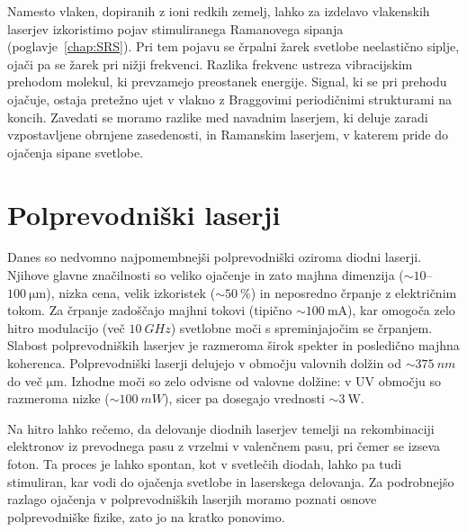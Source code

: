 \begin{remark}
 Namesto vlaken, dopiranih z ioni redkih zemelj, lahko za izdelavo vlakenskih laserjev
 izkoristimo pojav stimuliranega Ramanovega sipanja (poglavje~\ref{chap:SRS}). 
 Pri tem pojavu se črpalni žarek svetlobe neelastično siplje, ojači pa se žarek 
 pri nižji frekvenci. Razlika frekvenc ustreza vibracijskim prehodom 
 molekul, ki prevzamejo preostanek energije. Signal, ki se pri prehodu ojačuje, 
 ostaja pretežno ujet v vlakno z Braggovimi periodičnimi strukturami na koncih.
 Zavedati se moramo razlike med navadnim laserjem, ki deluje zaradi vzpostavljene
 obrnjene zasedenosti, in Ramanskim laserjem, v katerem pride do ojačenja sipane
 svetlobe.
\end{remark}

\section{Polprevodniški laserji}
Danes so nedvomno najpomembnejši polprevodniški oziroma diodni 
laserji. Njihove glavne značilnosti so veliko ojačenje in zato majhna 
dimenzija ($\sim 10$--$100~\si{\micro\metre}$), nizka cena, 
velik izkoristek ($\sim 50~\%$) in neposredno črpanje z električnim tokom. 
Za črpanje zadoščajo majhni tokovi 
(tipično $\sim 100~\si{\milli\ampere}$), kar omogoča zelo hitro modulacijo (več $10~\si{GHz}$)
svetlobne moči s spreminjajočim se črpanjem. Slabost polprevodniških laserjev je razmeroma širok 
spekter in posledično majhna koherenca. Polprevodniški laserji delujejo v območju 
valovnih dolžin od $\sim 375~\si{nm}$ do več $\si{\micro\meter}$. Izhodne moči
so zelo odvisne od valovne dolžine: v UV območju so razmeroma nizke ($\sim 100~\si{mW}$),
sicer pa dosegajo vrednosti $\sim 3~\si{\watt}$.

Na hitro lahko rečemo, da delovanje diodnih laserjev temelji na rekombinaciji  
elektronov iz prevodnega pasu z vrzelmi v valenčnem pasu, pri čemer se izseva foton. Ta proces je lahko 
spontan, kot v svetlečih diodah, lahko pa tudi stimuliran, kar vodi do ojačenja svetlobe 
in laserskega delovanja. Za podrobnejšo razlago ojačenja v polprevodniških 
laserjih moramo poznati osnove polprevodniške fizike, zato jo na kratko ponovimo.  

